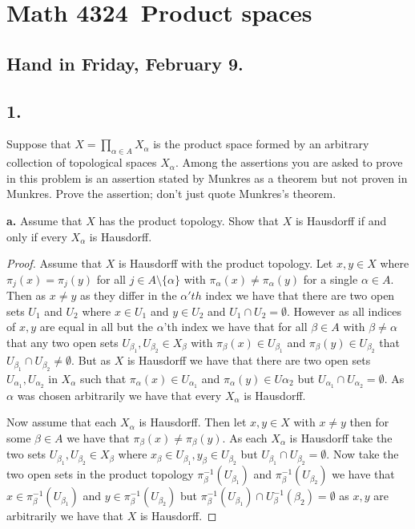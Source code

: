 \documentclass{amsart}
\theoremstyle{plain}
\theoremstyle{definition}
\theoremstyle{remark}
\begin{document}
\section*{Math 4324\  Product spaces } 

\subsection*{Hand in Friday, February 9.} 
\vspace{.15in}


\noindent
\subsection*{1.}  Suppose that  $X = \prod _{\alpha \in A} X_{\alpha}$ is the product space formed by an arbitrary collection of topological spaces $X_{\alpha}$. Among the assertions you are asked to prove in this problem is an assertion stated by Munkres as a theorem but not proven in Munkres. Prove the assertion; don't just quote Munkres's theorem. 

\vspace{.1in}
{\bfseries a.} Assume that $X$ has the product topology. Show that $X$ is Hausdorff if and only if every $X_{\alpha}$ is Hausdorff. 


\begin{proof}
    Assume that $X$ is Hausdorff with the product topology. Let $x,y\in X$ where $\pi_j(x)=\pi_j(y)$ for all $j\in A\setminus \{\alpha\}$ with $\pi_\alpha(x) \not = \pi_\alpha(y)$ for a single $\alpha \in A$. Then as $x\not = y$ as they differ in the $\alpha'th$ index we have that there are two open sets $U_1$ and $U_2$ where $x\in U_1$ and $y\in U_2$ and $U_1\cap U_2 =\emptyset$. However as all indices of $x,y$ are equal in all but the $\alpha$'th index we have that for all $\beta \in A$ with $\beta\not = \alpha$ that any two open sets $U_{\beta_1},U_{\beta_2}\in X_\beta$ with $\pi_\beta(x)\in U_{\beta_1}$ and $\pi_\beta(y)\in U_{\beta_2}$ that $U_{\beta_1}\cap U_{\beta_2}\not = \emptyset$. But as $X$ is Hausdorff we have that there are two open sets $U_{\alpha_1}, U_{\alpha_2}$ in $X_\alpha$ such that $\pi_\alpha(x) \in U_{\alpha_1}$ and $\pi_\alpha(y) \in U{\alpha_2}$ but $U_{\alpha_1}\cap U_{\alpha_2}=\emptyset$. As $\alpha$ was chosen arbitrarily we have that every $X_\alpha$ is Hausdorff. 

    Now assume that each $X_\alpha$ is Hausdorff. Then let $x,y\in X$ with $x\not = y$ then for some $\beta\in A$ we have that $\pi_\beta(x)\not = \pi_\beta(y)$. As each $X_\alpha$ is Hausdorff take the two sets $U_{\beta_1},U_{\beta_2}\in X_\beta$ where $x_\beta \in U_{\beta_1},y_\beta \in U_{\beta_2}$ but $U_{\beta_1}\cap U_{\beta_2}=\emptyset$. Now take the two open sets in the product topology $\pi_{\beta}^{-1}(U_{\beta_1})$ and $\pi_{\beta}^{-1}(U_{\beta_2})$ we have that $x\in\pi_{\beta}^{-1}(U_{\beta_1}) $ and $y\in\pi_{\beta}^{-1}(U_{\beta_2})$ but $\pi_{\beta}^{-1}(U_{\beta_1})\cap U_\beta^{-1}(\beta_2)=\emptyset$ as $x,y$ are arbitrarily we have that $X$ is Hausdorff.
    

\end{proof}
\end{document}
